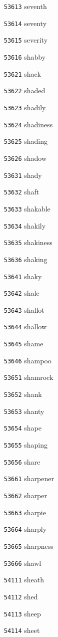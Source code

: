 \documentclass[twoside,11pt]{article}
\begin{document}
\begin{multicols}{5}
\begin{enumerate}
\item[\texttt{53613}] seventh
\item[\texttt{53614}] seventy
\item[\texttt{53615}] severity
\item[\texttt{53616}] shabby
\item[\texttt{53621}] shack
\item[\texttt{53622}] shaded
\item[\texttt{53623}] shadily
\item[\texttt{53624}] shadiness
\item[\texttt{53625}] shading
\item[\texttt{53626}] shadow
\item[\texttt{53631}] shady
\item[\texttt{53632}] shaft
\item[\texttt{53633}] shakable
\item[\texttt{53634}] shakily
\item[\texttt{53635}] shakiness
\item[\texttt{53636}] shaking
\item[\texttt{53641}] shaky
\item[\texttt{53642}] shale
\item[\texttt{53643}] shallot
\item[\texttt{53644}] shallow
\item[\texttt{53645}] shame
\item[\texttt{53646}] shampoo
\item[\texttt{53651}] shamrock
\item[\texttt{53652}] shank
\item[\texttt{53653}] shanty
\item[\texttt{53654}] shape
\item[\texttt{53655}] shaping
\item[\texttt{53656}] share
\item[\texttt{53661}] sharpener
\item[\texttt{53662}] sharper
\item[\texttt{53663}] sharpie
\item[\texttt{53664}] sharply
\item[\texttt{53665}] sharpness
\item[\texttt{53666}] shawl
\item[\texttt{54111}] sheath
\item[\texttt{54112}] shed
\item[\texttt{54113}] sheep
\item[\texttt{54114}] sheet

\end{enumerate}
\end{multicols}
\end{document}

